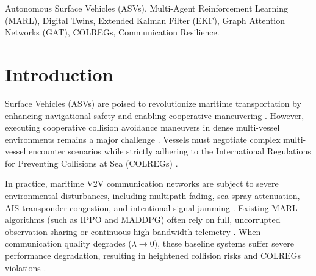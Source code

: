 \documentclass[journal,twocolumn,10pt]{IEEEtran}
\begin{document}
\begin{abstract}
converging multi-sector port approach and a restricted-visibility crossing (both $N=6$), on which every trained RL variant, not only MARLIN-Twin, clearly outperforms Rule-Based COLREGs; a fourth, cleaner multi-vessel channel-convergence scenario continues to favor Rule-Based COLREGs, consistent with it never presenting the conflicting-obligation failure mode the other two do. We validate the EKF/JPDA Digital Twin against a real NOAA MarineCadastre AIS trajectory (475m overall RMSE, 1471m during an injected 300s blackout). We report every seeding, measurement-harness, and metric-consistency bug found across both the original and this follow-up evaluation, and the statistical conclusions that changed once each was fixed, as a central part of this paper's contribution: an evaluation's comparative claims are only as trustworthy as its randomization and measurement infrastructure, and a result that reverses under closer scrutiny is worth reporting precisely because it did.
\end{abstract}

\begin{keywords}
Autonomous Surface Vehicles (ASVs), Multi-Agent Reinforcement Learning (MARL), Digital Twins, Extended Kalman Filter (EKF), Graph Attention Networks (GAT), COLREGs, Communication Resilience.
\end{keywords}

\section{Introduction}
 Surface Vehicles (ASVs) are poised to revolutionize maritime transportation by enhancing navigational safety and enabling cooperative maneuvering \cite{zheng2025marl}. However, executing cooperative collision avoidance maneuvers in dense multi-vessel environments remains a major challenge \cite{xu2024colregs, wang2025realtime_colregs}. Vessels must negotiate complex multi-vessel encounter scenarios while strictly adhering to the International Regulations for Preventing Collisions at Sea (COLREGs) \cite{tang2023colregs}.

In practice, maritime V2V communication networks are subject to severe environmental disturbances, including multipath fading, sea spray attenuation, AIS transponder congestion, and intentional signal jamming \cite{alqurashi2024maritime}. Existing MARL algorithms (such as IPPO and MADDPG) often rely on full, uncorrupted observation sharing or continuous high-bandwidth telemetry \cite{hu2023eventtriggered}. When communication quality degrades ($\lambda \to 0$), these baseline systems suffer severe performance degradation, resulting in heightened collision risks and COLREGs violations \cite{gu2024resilient_marl}.
\end{document}
